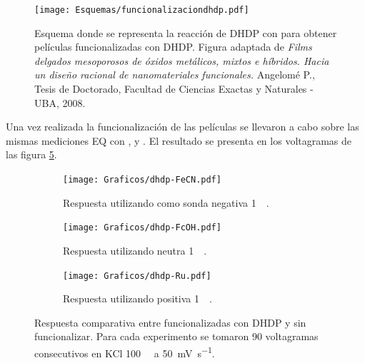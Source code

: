 				 \begin{figure}[ht!]	
					\centering
			 	    \texttt{[image: Esquemas/funcionalizaciondhdp.pdf]}
			        \caption[Funcionalización con DHDP 3mM]{Esquema donde se representa la reacción de DHDP con \pdmZ\space para obtener películas funcionalizadas con DHDP. Figura adaptada de \textit{Films delgados mesoporosos de óxidos metálicos, mixtos e híbridos. Hacia un diseño racional de nanomateriales funcionales.} Angelomé P., Tesis de Doctorado, Facultad de Ciencias Exactas y Naturales - UBA, 2008.\cite{Angelome2008}}
			        \label{esq:dhdp-esquema}
			      	\end{figure}

			\pagebreak

			Una vez realizada la funcionalización de las películas se llevaron a cabo sobre las mismas mediciones EQ con \fe, \fc\space y \ru. El resultado se presenta en los voltagramas de las figura \ref{fig:dhdp-vc}. 

		    	\begin{figure}[h!]	
					\begin{subfigure}[t]{0.495\textwidth}
			 	    \texttt{[image: Graficos/dhdp-FeCN.pdf]}
			        \caption{Respuesta utilizando como sonda negativa \ferroferri\space \SI{1}{\milli\Molar}.}
			        \label{fig:dhdp-vc-fe}
			        \end{subfigure}
			         \begin{subfigure}[t]{0.495\textwidth}
			 	    \texttt{[image: Graficos/dhdp-FcOH.pdf]}
			        \caption{Respuesta utilizando neutra \fc\space \SI{1}{\milli\Molar}.}
			        \label{fig:dhdp-vc-fc}
			        \end{subfigure}
			        \begin{center}
			        \begin{subfigure}[t]{0.60\textwidth}
			 	    \texttt{[image: Graficos/dhdp-Ru.pdf]}
			        \caption{Respuesta utilizando positiva \aminorutenio\space \SI{1}{\milli\Molar}.}
			        \label{fig:dhdp-vc-ru}
			        \end{subfigure}
			        \end{center}
			        \caption[Voltagramas de \pdmZ$^P_3$ con \aminorutenio, \fc\space y \ferroferri]{Respuesta comparativa entre \pdmZ\space funcionalizadas con DHDP y sin funcionalizar. Para cada experimento se tomaron 90 voltagramas consecutivos en KCl \SI{100}{\milli\Molar} a \SI{50}{\milli\volt\per\second}.}
			        \label{fig:dhdp-vc}
			      	\end{figure}

